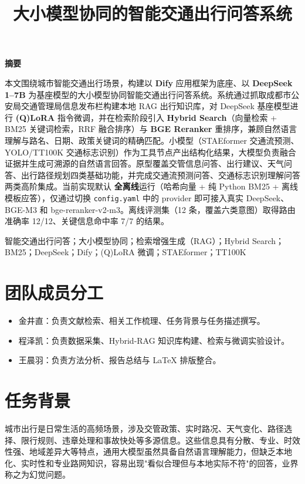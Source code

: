 \documentclass[bwprint]{report}
\title{大小模型协同的智能交通出行问答系统}
\begin{document}
\maketitle
\newpage

\pagestyle{plain}
\begin{center}
    {\bfseries 摘要}
\end{center}

本文围绕城市智能交通出行场景，构建以 \textbf{Dify} 应用框架为底座、以 \textbf{DeepSeek 1--7B} 为基座模型的大小模型协同智能交通出行问答系统。系统通过抓取成都市公安局交通管理局信息发布栏构建本地 RAG 出行知识库，对 DeepSeek 基座模型进行 \textbf{(Q)LoRA} 指令微调，并在检索阶段引入 \textbf{Hybrid Search}（向量检索 + BM25 关键词检索，RRF 融合排序）与 \textbf{BGE Reranker} 重排序，兼顾自然语言理解与路名、日期、政策关键词的精确匹配。小模型（STAEformer 交通流预测、YOLO/TT100K 交通标志识别）作为工具节点产出结构化结果，大模型负责融合证据并生成可溯源的自然语言回答。原型覆盖交管信息问答、出行建议、天气问答、出行路径规划四类基础功能，并完成交通流预测问答、交通标志识别理解问答两类高阶集成。当前实现默认 \textbf{全离线}运行（哈希向量 + 纯 Python BM25 + 离线模板应答），仅通过切换 \texttt{config.yaml} 中的 provider 即可接入真实 DeepSeek、BGE-M3 和 bge-reranker-v2-m3。离线评测集（12 条，覆盖六类意图）取得路由准确率 12/12、关键信息命中率 7/7 的结果。

\vspace{0.5em}
智能交通出行问答；大小模型协同；检索增强生成（RAG）；Hybrid Search；BM25；DeepSeek；Dify；(Q)LoRA 微调；STAEformer；TT100K

\newpage
\tableofcontents
\newpage
\pagestyle{plain}

\setcounter{page}{1}

\section{团队成员分工}
\begin{itemize}
    \item 金井直：负责文献检索、相关工作梳理、任务背景与任务描述撰写。
    \item 程泽凯：负责数据采集、Hybrid-RAG 知识库构建、检索与微调实验设计。
    \item 王晨羽：负责方法分析、报告总结与 \LaTeX{} 排版整合。
\end{itemize}

\section{任务背景}
城市出行是日常生活的高频场景，涉及交管政策、实时路况、天气变化、路径选择、限行规则、违章处理和事故快处等多源信息。这些信息具有分散、专业、时效性强、地域差异大等特点，通用大模型虽然具备自然语言理解能力，但缺乏本地化、实时性和专业路网知识，容易出现"看似合理但与本地实际不符"的回答，业界称之为幻觉问题。
\end{document}
